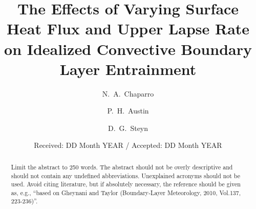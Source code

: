 \title{The Effects of Varying Surface Heat Flux and Upper Lapse Rate on Idealized Convective Boundary Layer Entrainment%
}


\author{N.~A.~Chaparro \and P.~H.~Austin \and D.~G.~Steyn
}



\date{Received: DD Month YEAR / Accepted: DD Month YEAR}


\maketitle

\begin{abstract}
Limit the abstract to 250 words. The abstract should not be overly descriptive and should not contain any undefined abbreviations. Unexplained acronyms should not be used. Avoid citing literature, but if absolutely necessary, the reference should be given as, e.g., ``based on Gheynani and Taylor (Boundary-Layer Meteorology, 2010, Vol.137, 223-236)''.
\end{abstract}

